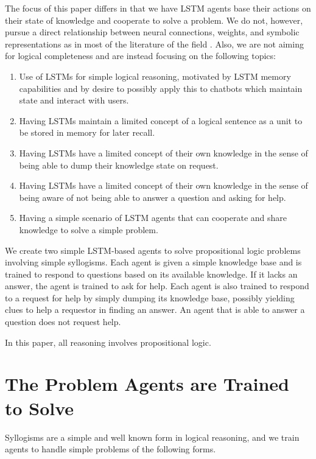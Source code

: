\documentclass{article}
\begin{document}
The focus of this paper differs
in that we have LSTM agents base their actions on their state of knowledge and
cooperate to solve a problem.  We do not, however, pursue a direct relationship
between neural connections, weights, and symbolic representations as in most
of the literature of the field
\cite{DBLP:journals/corr/abs-1711-03902}.  Also, we are not aiming for logical
completeness and are instead focusing on the following topics:
\begin{enumerate}
\item Use of LSTMs for simple logical reasoning, motivated by LSTM memory
capabilities and by desire to possibly apply this to chatbots which maintain
state and interact with users.
\item Having LSTMs maintain a limited concept of a logical sentence as a unit
to be stored in memory for later recall.
\item Having LSTMs have a limited concept of their own knowledge in the sense
of being able to dump their knowledge state on request.
\item Having LSTMs have a limited concept of their own knowledge in the sense
of being aware of not being able to answer a question and asking for help.
\item Having a simple scenario of LSTM agents that can cooperate and share knowledge
to solve a simple problem.
\end{enumerate}


We create two simple LSTM-based agents to solve propositional
logic problems involving simple syllogisms.  Each agent is given a
simple knowledge base and is trained to respond to questions based on
its available knowledge.  If it lacks an answer, the agent is trained to
ask for help.  Each agent is also trained to respond to a request for
help by simply dumping its knowledge base, possibly yielding clues to
help a requestor in finding an answer.  An agent that is able to answer
a question does not request help.

In this paper, all reasoning involves propositional logic.

\section{The Problem Agents are Trained to Solve}

Syllogisms are a simple and well known form in logical reasoning,
and we train agents to handle simple problems of the following forms.
\end{document}
